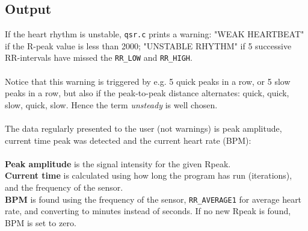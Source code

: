 \subsection{Output}
If the heart rhythm is unstable, \texttt{qsr.c} prints a warning: "WEAK HEARTBEAT" if the R-peak value is less than 2000; "UNSTABLE RHYTHM" if 5 successive RR-intervals have missed the \texttt{RR\_LOW} and \texttt{RR\_HIGH}. \\
\\
Notice that this warning is triggered by e.g. 5 quick peaks in a row, or 5 slow peaks in a row, but also if the peak-to-peak distance alternates: quick, quick, slow, quick, slow. Hence the term \textit{unsteady} is well chosen.\\
\\
The data regularly presented to the user (not warnings) is peak amplitude, current time peak was detected and the current heart rate (BPM):\\
\\
\textbf{Peak amplitude} is the signal intensity for the given Rpeak. \\
\textbf{Current time} is calculated using how long the program has run (iterations), and the frequency of the sensor. \\
\textbf{BPM} is found using the frequency of the sensor, \texttt{RR\_AVERAGE1} for average heart rate, and converting to minutes instead of seconds. If no new Rpeak is found, BPM is set to zero. 